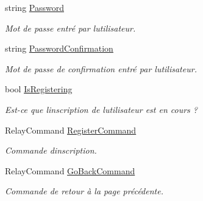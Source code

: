 \begin{DoxyCompactItemize}
string \hyperlink{class_boxes_1_1_view_models_1_1_register_view_model_a88e8df0efe69ebd8fa951b76a2c8018c}{Password}
\begin{DoxyCompactList}\small\item\em Mot de passe entré par l\textquotesingle{}utilisateur. \end{DoxyCompactList}\item 
string \hyperlink{class_boxes_1_1_view_models_1_1_register_view_model_a858d39f447598841d607c8299ff1abb5}{Password\+Confirmation}
\begin{DoxyCompactList}\small\item\em Mot de passe de confirmation entré par l\textquotesingle{}utilisateur. \end{DoxyCompactList}\item 
bool \hyperlink{class_boxes_1_1_view_models_1_1_register_view_model_aadd1c445ed909526cf2ff9ffa1604e7c}{Is\+Registering}
\begin{DoxyCompactList}\small\item\em Est-\/ce que l\textquotesingle{}inscription de l\textquotesingle{}utilisateur est en cours ? \end{DoxyCompactList}\item 
Relay\+Command \hyperlink{class_boxes_1_1_view_models_1_1_register_view_model_a21f0b17057452c9ac974122df5fdbc0e}{Register\+Command}
\begin{DoxyCompactList}\small\item\em Commande d\textquotesingle{}inscription. \end{DoxyCompactList}\item 
Relay\+Command \hyperlink{class_boxes_1_1_view_models_1_1_register_view_model_a995a3cce93db8b0f82262ce814c52514}{Go\+Back\+Command}
\begin{DoxyCompactList}\small\item\em Commande de retour à la page précédente. \end{DoxyCompactList}\end{DoxyCompactItemize}
